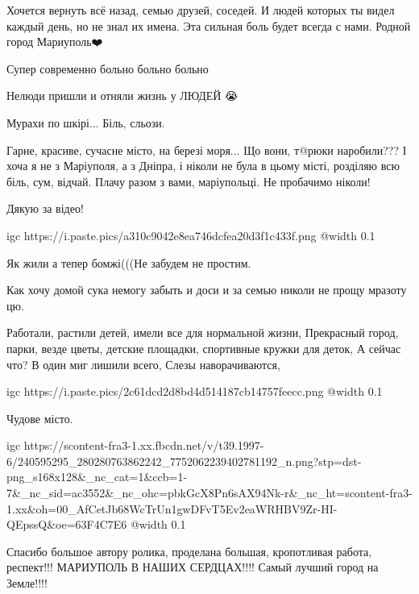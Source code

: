 
Хочется вернуть всё назад, семью друзей, соседей. И людей которых ты видел
каждый день, но не знал их имена. Эта сильная боль будет всегда с нами. Родной
город Мариуполь❤️🙏


Супер современно больно больно больно


Нелюди пришли и отняли жизнь у ЛЮДЕЙ 😭


Мурахи по шкірі... Біль, сльози.

Гарне, красиве, сучасне місто, на березі моря... Що вони, т@рюки наробили??? І
хоча я не з Маріуполя, а з Дніпра, і ніколи не була в цьому місті, розділяю
всю біль, сум, відчай. Плачу разом з вами, маріупольці. Не пробачимо ніколи!

Дякую за відео!


\ifcmt
  igc https://i.paste.pics/a310c9042e8ea746dcfea20d3f1c433f.png
	@width 0.1
\fi


Як жили а тепер бомжі(((Не забудем не простим.


Как хочу домой сука немогу забыть и доси и за семью николи не прощу мразоту цю.


Работали, растили детей, имели все для нормальной жизни, Прекрасный город,
парки, везде цветы, детские площадки, спортивные кружки для деток, А сейчас
что? В один миг лишили всего, Слезы наворачиваются,


\ifcmt
  igc https://i.paste.pics/2c61dcd2d8bd4d514187cb14757feecc.png
	@width 0.1
\fi


Чудове місто.

\ifcmt
  igc https://scontent-fra3-1.xx.fbcdn.net/v/t39.1997-6/240595295_280280763862242_7752062239402781192_n.png?stp=dst-png_s168x128&_nc_cat=1&ccb=1-7&_nc_sid=ac3552&_nc_ohc=pbkGcX8Pn6sAX94Nk-r&_nc_ht=scontent-fra3-1.xx&oh=00_AfCetJb68WcTrUn1gwDFvT5Ev2eaWRHBV9Zr-HI-QEpssQ&oe=63F4C7E6
	@width 0.1
\fi


Спасибо большое автору ролика, проделана большая, кропотливая работа,
респект!!! МАРИУПОЛЬ В НАШИХ СЕРДЦАХ!!!! Самый лучший город на Земле!!!!

